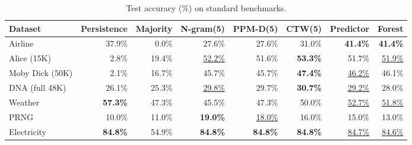 \begin{table}[h]
\centering
\caption{Test accuracy (\%) on standard benchmarks.}
\label{tab:main_accuracy}
\begin{tabular}{lrrrrrrr}
\toprule
Dataset & Persistence & Majority & N-gram(5) & PPM-D(5) & CTW(5) & Predictor & Forest \\
\midrule
Airline & 37.9\% & 0.0\% & 27.6\% & 27.6\% & 31.0\% & \textbf{41.4\%} & \textbf{41.4\%} \\
Alice (15K) & 2.8\% & 19.4\% & \underline{52.2\%} & 51.6\% & \textbf{53.3\%} & 51.7\% & \underline{51.9\%} \\
Moby Dick (50K) & 2.1\% & 16.7\% & 45.7\% & 45.7\% & \textbf{47.4\%} & \underline{46.2\%} & 46.1\% \\
DNA (full 48K) & 26.1\% & 25.3\% & \underline{29.8\%} & 29.7\% & \textbf{30.7\%} & \underline{29.2\%} & 28.0\% \\
Weather & \textbf{57.3\%} & 47.3\% & 45.5\% & 47.3\% & 50.0\% & \underline{52.7\%} & \underline{51.8\%} \\
PRNG & 10.0\% & 11.0\% & \textbf{19.0\%} & \underline{18.0\%} & 16.0\% & 15.0\% & 13.0\% \\
Electricity & \textbf{84.8\%} & 54.9\% & \textbf{84.8\%} & \textbf{84.8\%} & \textbf{84.8\%} & \underline{84.7\%} & \underline{84.6\%} \\
\bottomrule
\end{tabular}
\end{table}
